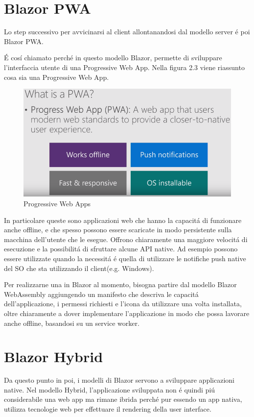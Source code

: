 \section{Blazor PWA}\label{sez:bpwa}
Lo step successivo per avvicinarsi al client allontanandosi dal modello server \'e poi Blazor PWA.

\'E cos\'i chiamato perch\'e in questo modello Blazor, permette di sviluppare l'interfaccia utente di una Progressive Web App.
Nella figura 2.3 viene riassunto cosa sia una Progressive Web App.

\begin{figure}[H]
	\centerline{\includegraphics[scale=0.5]{figure/ProgressiveWebApp.png}}
	\caption{Progressive Web Apps}
	\label{fig:WhatIsAPWA}
\end{figure}


In particolare queste sono applicazioni web che hanno la capacit\'a di funzionare anche offline, e che spesso possono essere scaricate in modo persistente sulla macchina dell'utente che le esegue.
Offrono chiaramente una maggiore velocit\'a di esecuzione e la possibilit\'a di sfruttare alcune API native.
Ad esempio possono essere utilizzate quando la necessit\'a \'e quella di utilizzare le notifiche push native del SO che sta utilizzando il client(e.g. Windows).

Per realizzarne una in Blazor al momento, bisogna partire dal modello Blazor WebAssembly aggiungendo un manifesto che descriva le capacit\'a dell'applicazione, i permessi richiesti e l'icona da utilizzare una volta installata, oltre chiaramente a dover implementare l'applicazione in modo che possa lavorare anche offline, basandosi su un service worker.\cite{blazorPWA}
\pagebreak

\section{Blazor Hybrid}\label{sez:bhybrid}
Da questo punto in poi, i modelli di Blazor servono a sviluppare applicazioni native.
Nel modello Hybrid, l'applicazione sviluppata non \'e quindi pi\'u considerabile una web app ma rimane ibrida perch\'e pur essendo un app nativa, utilizza tecnologie web per effettuare il rendering della user interface.

